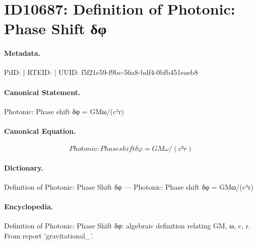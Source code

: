 \section*{ID10687: Definition of Photonic: Phase Shift δφ}
\paragraph{Metadata.}
PiID:  | RTEID:  | UUID: f5f21e59-f9bc-56a8-bdf4-0bfb451eaeb8

\paragraph{Canonical Statement.}
Photonic: Phase shift δφ = GMω/(c³r)

\paragraph{Canonical Equation.}
\[
Photonic: Phase shift δφ = GMω/(c³r)
\]

\paragraph{Dictionary.}
Definition of Photonic: Phase Shift δφ — Photonic: Phase shift δφ = GMω/(c³r)

\paragraph{Encyclopedia.}
Definition of Photonic: Phase Shift δφ: algebraic definition relating GM, ω, c, r. From report 'gravitational\_'.

